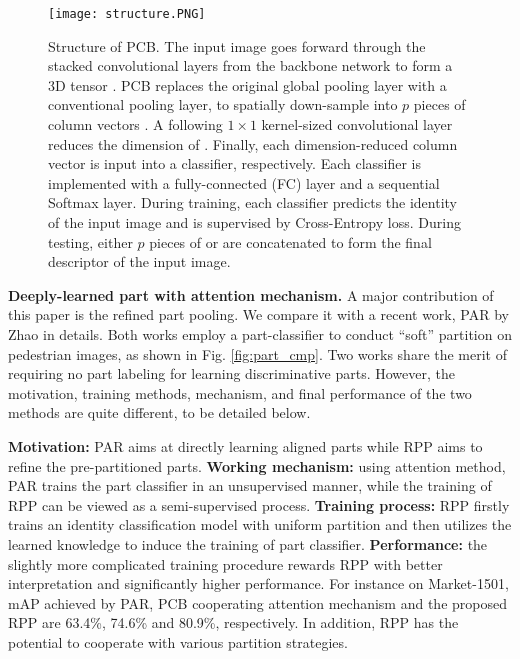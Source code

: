 \documentclass[10pt,twocolumn,letterpaper]{article}
\begin{document}
\begin{figure*}[t]
\centering
\texttt{[image: structure.PNG]}

\caption{Structure of PCB. The input image goes forward through the stacked convolutional layers from the backbone network to form a 3D tensor . PCB replaces the original global pooling layer with a conventional pooling layer, to spatially down-sample  into $p$ pieces of column vectors . A following $1 \times 1$ kernel-sized convolutional layer reduces the dimension of . Finally, each dimension-reduced column vector  is input into a classifier, respectively. Each classifier is implemented with a fully-connected (FC) layer and a sequential Softmax layer. During training, each classifier predicts the identity of the input image and is supervised by Cross-Entropy loss. During testing, either $p$ pieces of  or  are concatenated to form the final descriptor of the input image.}
\label{fig:structure}
\end{figure*}


\textbf{Deeply-learned part with attention mechanism.} A major contribution of this paper is the refined part pooling. We compare it with a recent work, PAR \cite{Yao2017Deep} by Zhao \etal in details. Both works employ a part-classifier to conduct ``soft'' partition on pedestrian images, as shown in Fig. \ref{fig:part_cmp}. Two works share the merit of requiring no part labeling for learning discriminative parts. However, the motivation, training methods, mechanism, and final performance of the two methods are quite different, to be detailed below.

\textbf{Motivation:} PAR aims at directly learning aligned parts while RPP aims to refine the pre-partitioned parts. \textbf{Working mechanism:} using attention method, PAR trains the part classifier in an unsupervised manner, while the training of RPP can be viewed as a semi-supervised process. \textbf{Training process:} RPP firstly trains an identity classification model with uniform partition and then utilizes the learned knowledge to induce the training of part classifier. \textbf{Performance:} the slightly more complicated training procedure rewards RPP with better interpretation and significantly higher performance. For instance on Market-1501, mAP achieved by PAR, PCB cooperating attention mechanism and the proposed RPP are 63.4\%, 74.6\% and 80.9\%, respectively. In addition, RPP has the potential to cooperate with various partition strategies. 
\end{document}
